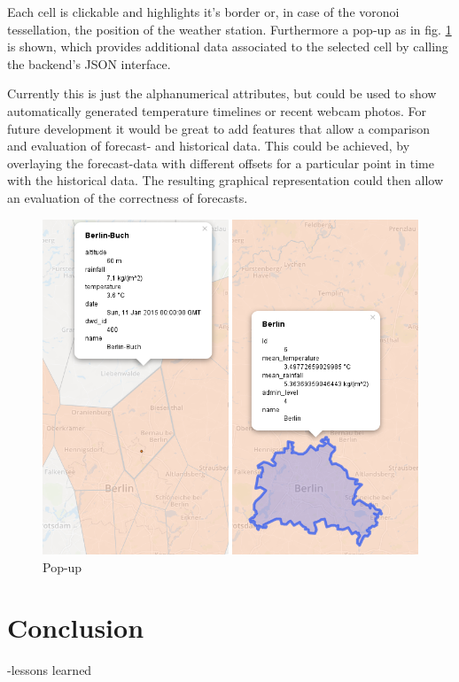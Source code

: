 \documentclass[paper=a4, fontsize=11pt]{article} %
\numberwithin{equation}{section} %
\numberwithin{figure}{section} %
\numberwithin{table}{section} %
\begin{document}
\newpage
Each cell is clickable and highlights it's border or, in case of the
voronoi tessellation, the position of the weather station. Furthermore a
pop-up as in fig. \ref{fig:popup} is shown, which provides additional data associated to the
selected cell by calling the backend's JSON interface.

Currently this is just the alphanumerical attributes, but could be used
to show automatically generated temperature timelines or recent webcam
photos.
For future development it would be great to add features that allow a comparison and evaluation of forecast- and historical data. This could be achieved, by overlaying the forecast-data with different offsets for a particular point in time with the historical data. The resulting graphical representation could then allow an evaluation of the correctness of forecasts.

\begin{figure}[htbp]
\centering
\includegraphics[width=1\textwidth]{pictures/screenshot-popup.png}
\caption{Pop-up}
\label{fig:popup}
\end{figure}



\section{Conclusion}

-lessons learned
\end{document}
